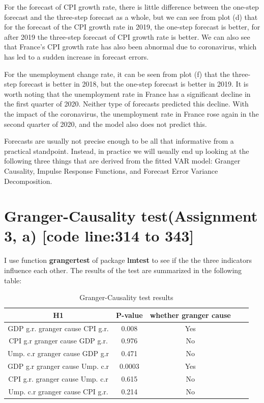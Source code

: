 \documentclass{report}
\begin{document}
For the forecast of CPI growth rate, there is little difference between the one-step forecast and the three-step forecast as a whole, but we can see from plot (d) that for the forecast of the CPI growth rate in 2019, the one-step forecast is better, for after 2019 the three-step forecast of CPI growth rate is better. We can also see that France’s CPI growth rate has also been abnormal due to coronavirus, which has led to a sudden increase in forecast errors.

For the unemployment change rate, it can be seen from plot (f) that the three-step forecast is better in 2018, but the one-step forecast is better in 2019. It is worth noting that the unemployment rate in France has a significant decline in the first quarter of 2020. Neither type of forecasts predicted this decline. With the impact of the coronavirus, the unemployment rate in France rose again in the second quarter of 2020, and the model also does not predict this.

Forecasts are usually not precise enough to be all that informative from a practical standpoint. Instead, in practice we will usually end up looking at the following three things that are derived from the fitted VAR model: Granger Causality, Impulse Response Functions, and Forecast Error Variance Decomposition.

\section{Granger-Causality test(Assignment 3, a) [code line:314 to 343]}

I use function \textbf{grangertest} of package \textbf{lmtest} to see if the the three indicators influence each other. The results of the test are summarized in the following table:

\begin{table}[H]
\centering
 \caption{\label{tab:gc} Granger-Causality test results}
 \begin{tabular}{ccccc}
  \toprule
\textbf{H1} & P-value & whether granger cause \\
  \midrule
GDP g.r. granger cause CPI g.r. & 0.008  & Yes\\
CPI g.r granger cause GDP g.r. & 0.976 & No\\
Ump. c.r granger cause GDP g.r & 0.471 & No \\
GDP g.r granger cause Ump. c.r & 0.0003 & Yes\\
CPI g.r. granger cause Ump. c.r & 0.615 & No\\
Ump. c.r granger cause CPI g.r. & 0.214 & No\\
  \bottomrule
 \end{tabular}
\end{table}
\end{document}
